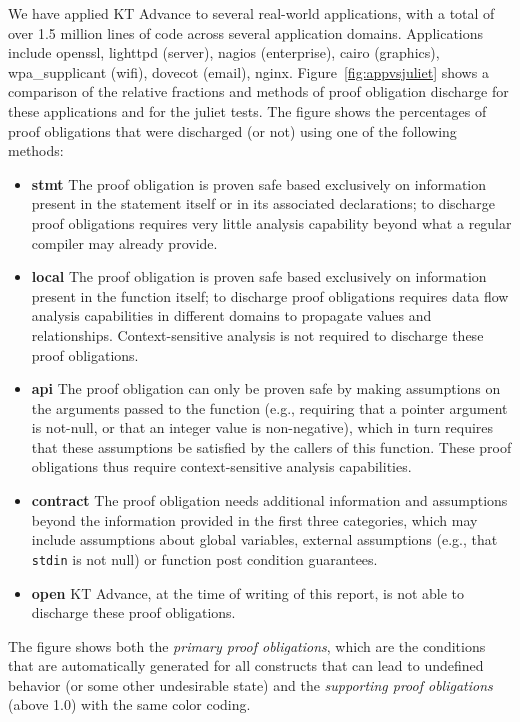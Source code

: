 \documentclass[11pt]{article}
\begin{document}
We have applied KT Advance to several real-world applications, with a total of over
1.5 million lines of code across several application domains. Applications include
openssl,  lighttpd (server), nagios (enterprise), cairo (graphics), 
wpa\_supplicant (wifi), dovecot (email),  nginx. Figure~\ref{fig:appvsjuliet} shows
a comparison of the relative fractions and methods of proof obligation discharge for
these applications and for the juliet tests. The figure shows the percentages of
proof obligations that were discharged (or not) using one of the following methods:
\begin{itemize}
\item {\bf stmt} The proof obligation is proven safe based exclusively on information
present in the statement itself or in its associated declarations; to discharge proof
obligations requires very little analysis capability beyond what a regular compiler
may already provide.
\item {\bf local} The proof obligation is proven safe based exclusively on information
present in the function itself; to discharge proof obligations requires data flow
analysis capabilities in different domains to propagate values and relationships. 
Context-sensitive analysis is not required to discharge these proof obligations.
\item {\bf api} The proof obligation can only be proven safe by making assumptions
on the arguments passed to the function (e.g., requiring that a pointer argument is
not-null, or that an integer value is non-negative), which in turn requires that 
these assumptions be satisfied by the callers of this function. These proof obligations
thus require context-sensitive analysis capabilities.
\item {\bf contract} The proof obligation needs additional information and assumptions
beyond the information provided in the first three categories, which may include 
assumptions about global variables, external assumptions (e.g., that {\tt stdin} is
not null) or function post condition guarantees. 
\item {\bf open} KT Advance, at the time of writing of this report, is not able to
discharge these proof obligations.
\end{itemize}
The figure shows both the \emph{primary proof obligations}, which are the conditions that
are  automatically generated for all constructs that can lead to undefined behavior
(or some other undesirable state) and the \emph{supporting proof obligations} (above 1.0)
with the same color coding.
\end{document}
